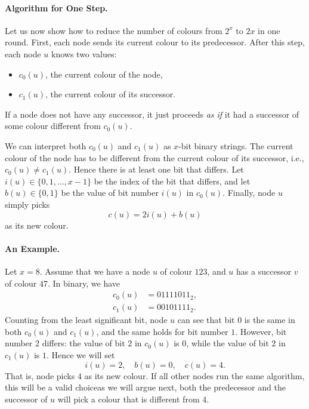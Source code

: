 \paragraph{Algorithm for One Step.}
Let us now show how to reduce the number of colours from $2^x$ to $2x$ in one round. First, each node sends its current colour to its predecessor. After this step, each node $u$ knows two values:
\begin{itemize}[noitemsep]
    \item $c_0(u)$, the current colour of the node,
    \item $c_1(u)$, the current colour of its successor.
\end{itemize}
If a node does not have any successor, it just proceeds \emph{as if} it had a successor of some colour different from $c_0(u)$.

We can interpret both $c_0(u)$ and $c_1(u)$ as $x$-bit binary strings. The current colour of the node has to be different from the current colour of its successor, i.e., $c_0(u) \ne c_1(u)$. Hence there is at least one bit that differs. Let $i(u) \in \{0,1,\dotsc,x-1\}$ be the index of the bit that differs, and let $b(u) \in \{0,1\}$ be the value of bit number $i(u)$ in $c_0(u)$. Finally, node $u$ simply picks
\[
    c(u) = 2i(u) + b(u)
\]
as its new colour.

\paragraph{An Example.}
Let $x = 8$. Assume that we have a node $u$ of colour $123$, and $u$ has a successor $v$ of colour $47$. In binary, we have
\begin{align*}
    c_0(u) &= 01111011_2, \\
    c_1(u) &= 00101111_2.
\end{align*}
Counting from the least significant bit, node $u$ can see that bit $0$ is the same in both $c_0(u)$ and $c_1(u)$, and the same holds for bit number $1$. However, bit number $2$ differs: the value of bit $2$ in $c_0(u)$ is $0$, while the value of bit $2$ in $c_1(u)$ is $1$. Hence we will set
\[
    i(u) = 2, \quad
    b(u) = 0, \quad
    c(u) = 4.
\]
That is, node picks $4$ as its new colour. If all other nodes run the same algorithm, this will be a valid choice\mydash as we will argue next, both the predecessor and the successor of $u$ will pick a colour that is different from $4$.

